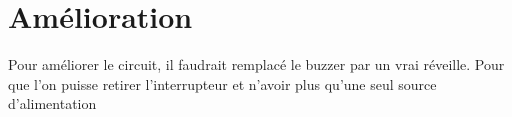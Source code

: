 \chapter{Amélioration}

Pour améliorer le circuit, il faudrait remplacé le buzzer par un vrai réveille. Pour que l'on puisse retirer l'interrupteur et n'avoir plus qu'une seul source d'alimentation





